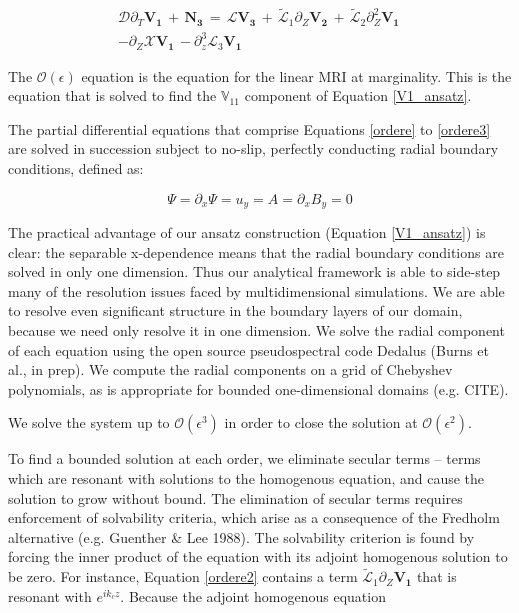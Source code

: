 \documentclass{emulateapj}
\newcommand{\beq}{\begin{equation}}
\newcommand{\eeq}{\end{equation}}
\begin{document}
\begin{multline}
\label{ordere3}
\mathcal{D}\partial_T \mathbf{V_1} \, + \, \mathbf{N_3} \, = \, \mathcal{L} \mathbf{V_3} \, + \, \widetilde{\mathcal{L}}_1\partial_Z\mathbf{V_2} \, + \, \widetilde{\mathcal{L}}_2\partial_Z^2\mathbf{V_1} \, \\
- \partial_Z\mathcal{X}\mathbf{V_1} \, - \partial_z^3\mathcal{L}_3\mathbf{V_1}
\end{multline}

The $\mathcal{O}(\epsilon)$ equation is the equation for the linear MRI at marginality. This is the equation that is solved to find the $\mathbb{V}_{11}$ component of Equation \ref{V1_ansatz}. 

The partial differential equations that comprise Equations \ref{ordere} to \ref{ordere3} are solved in succession subject to no-slip, perfectly conducting radial boundary conditions, defined as:

\beq
\Psi = \partial_x \Psi = u_y = A = \partial_x B_y = 0
\eeq

The practical advantage of our ansatz construction (Equation \ref{V1_ansatz}) is clear: the separable x-dependence means that the radial boundary conditions are solved in only one dimension. Thus our analytical framework is able to side-step many of the resolution issues faced by multidimensional simulations. We are able to resolve even significant structure in the boundary layers of our domain, because we need only resolve it in one dimension. We solve the radial component of each equation using the open source pseudospectral code Dedalus (Burns et al., in prep). We compute the radial components on a grid of Chebyshev polynomials, as is appropriate for bounded one-dimensional domains (e.g. CITE). 

We solve the system up to $\mathcal{O}(\epsilon^3)$ in order to close the solution at $\mathcal{O}(\epsilon^2)$. 

To find a bounded solution at each order, we eliminate secular terms -- terms which are resonant with solutions to the homogenous equation, and cause the solution to grow without bound. The elimination of secular terms requires enforcement of solvability criteria, which arise as a consequence of the Fredholm alternative (e.g. Guenther \& Lee 1988). The solvability criterion is found by forcing the inner product of the equation with its adjoint homogenous solution to be zero. For instance, Equation \ref{ordere2} contains a term $\widetilde{\mathcal{L}}_1 \partial_Z \mathbf{V_1}$ that is resonant with $e^{i k_c z}$. Because the adjoint homogenous equation
\end{document}
